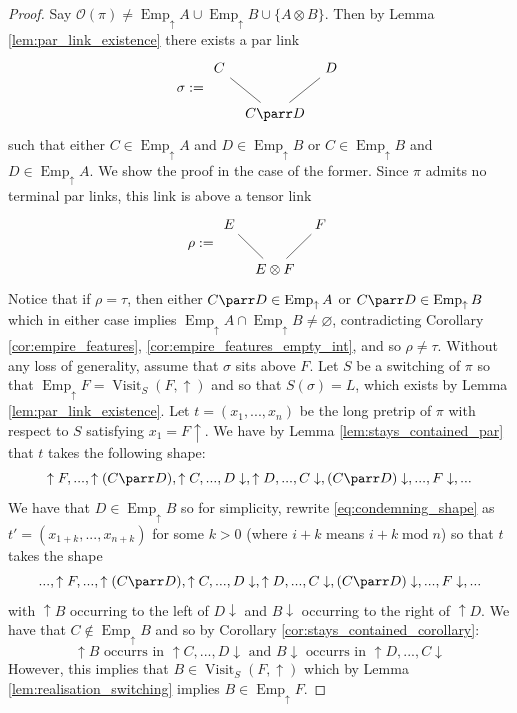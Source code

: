 \documentclass[12pt]{article}
\theoremstyle{plain}
\theoremstyle{definition}
\newcommand{\call}[1]{\mathcal{#1}}
\begin{document}
\begin{proof}
		Say $\call{O}(\pi) \neq \operatorname{Emp}_{\uparrow}A \cup \operatorname{Emp}_{\uparrow}B \cup \lbrace A \otimes B\rbrace$. Then by Lemma \ref{lem:par_link_existence} there exists a par link
		\[
		\sigma := \begin{tikzcd}[column sep = tiny]
			C\arrow[dr,dash] && D\arrow[dl,dash]\\
			& C \parr D
		\end{tikzcd}
		\]
		such that either $C \in \operatorname{Emp}_{\uparrow}A$ and $D \in \operatorname{Emp}_{\uparrow}B$ or $C \in \operatorname{Emp}_{\uparrow}B$ and $D \in \operatorname{Emp}_{\uparrow}A$. We show the proof in the case of the former. Since $\pi$ admits no terminal par links, this link is above a tensor link
		\[
		\rho := \begin{tikzcd}[column sep = tiny]
			E\arrow[dr,dash] && F\arrow[dl,dash]\\
			& E \otimes F
		\end{tikzcd}
		\]
		Notice that if $\rho = \tau$, then either $C \parr D \in \operatorname{Emp}_{\uparrow}A$ or $C \parr D \in \operatorname{Emp}_{\uparrow}B$ which in either case implies $\operatorname{Emp}_{\uparrow}A \cap \operatorname{Emp}_{\uparrow}B \neq \varnothing$, contradicting Corollary \ref{cor:empire_features}, \ref{cor:empire_features_empty_int}, and so $\rho \neq \tau$. Without any loss of generality, assume that $\sigma$ sits above $F$. Let $S$ be a switching of $\pi$ so that $\operatorname{Emp}_{\uparrow}F = \operatorname{Visit}_S(F,\uparrow)$ and so that $S(\sigma) = L$, which exists by Lemma \ref{lem:par_link_existence}. Let $t = (x_1,...,x_n)$ be the long pretrip of $\pi$ with respect to $S$ satisfying $x_1 = F\uparrow$. We have by Lemma \ref{lem:stays_contained_par} that $t$ takes the following shape:
		\begin{equation}\label{eq:condemning_shape}
			\uparrow F, ..., \uparrow(C \parr D), \uparrow C, ..., D\downarrow, \uparrow D, ..., C\downarrow, (C \parr D)\downarrow, ..., F\downarrow,...
		\end{equation}
		We have that $D \in \operatorname{Emp}_{\uparrow}B$ so for simplicity, rewrite \eqref{eq:condemning_shape} as $t' = (x_{1 + k},...,x_{n+k})$ for some $k > 0$ (where $i + k$ means $i + k\operatorname{mod} n$) so that $t$ takes the shape
		\begin{equation}\label{eq:condemning_shape_altered}
			..., \uparrow F, ..., \uparrow(C \parr D), \uparrow C, ..., D\downarrow, \uparrow D, ..., C\downarrow, (C \parr D)\downarrow, ..., F\downarrow,...
		\end{equation}
		with $\uparrow B$ occurring to the left of $D \downarrow$ and $B \downarrow$ occurring to the right of $\uparrow D$.
		We have that $C \not\in \operatorname{Emp}_{\uparrow}B$ and so by Corollary \ref{cor:stays_contained_corollary}:
		\begin{equation}
			\uparrow B \text{ occurrs in }\uparrow C,..., D\downarrow\text{ and } B\downarrow\text{ occurrs in }\uparrow D, ..., C\downarrow
		\end{equation}
		However, this implies that $B \in \operatorname{Visit}_S(F,\uparrow)$ which by Lemma \ref{lem:realisation_switching} implies $B \in \operatorname{Emp}_{\uparrow}F$.
		

\end{proof}
\end{document}
